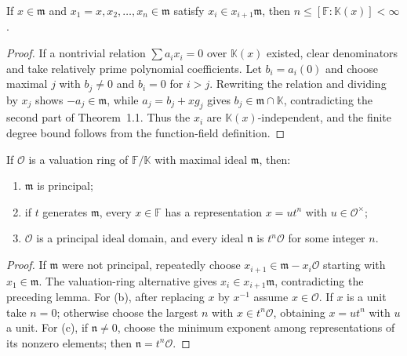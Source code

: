 \begin{lemma}
\label{par-lem-maximal-chain}
\uses{}
If $x\in\mathfrak m$ and $x_1=x,x_2,\ldots,x_n\in\mathfrak m$ satisfy
$x_i\in x_{i+1}\mathfrak m$, then
$n\leq[\mathbb F:\mathbb K(x)]<\infty$.
\end{lemma}
\begin{proof}
If a nontrivial relation $\sum a_ix_i=0$ over $\mathbb K(x)$ existed, clear
denominators and take relatively prime polynomial coefficients. Let $b_i=a_i(0)$
and choose maximal $j$ with $b_j\neq0$ and $b_i=0$ for $i>j$. Rewriting the
relation and dividing by $x_j$ shows $-a_j\in\mathfrak m$, while
$a_j=b_j+xg_j$ gives $b_j\in\mathfrak m\cap\mathbb K$, contradicting the
second part of Theorem~1.1. Thus the $x_i$ are $\mathbb K(x)$-independent, and
the finite degree bound follows from the function-field definition.
\end{proof}

\begin{theorem}
\label{par-thm-valuation-ring-structure}
\uses{}
If $\mathcal O$ is a valuation ring of $\mathbb F/\mathbb K$ with maximal
ideal $\mathfrak m$, then:
\begin{enumerate}
\item $\mathfrak m$ is principal;
\item if $t$ generates $\mathfrak m$, every $x\in\mathbb F$ has a representation
$x=ut^n$ with $u\in\mathcal O^\times$;
\item $\mathcal O$ is a principal ideal domain, and every ideal $\mathfrak n$ is
$t^n\mathcal O$ for some integer $n$.
\end{enumerate}
\end{theorem}
\begin{proof}
If $\mathfrak m$ were not principal, repeatedly choose
$x_{i+1}\in\mathfrak m-x_i\mathcal O$ starting with $x_1\in\mathfrak m$.
The valuation-ring alternative gives $x_i\in x_{i+1}\mathfrak m$, contradicting
the preceding lemma. For (b), after replacing $x$ by $x^{-1}$ assume $x\in\mathcal O$.
If $x$ is a unit take $n=0$; otherwise choose the largest $n$ with
$x\in t^n\mathcal O$, obtaining $x=ut^n$ with $u$ a unit. For (c), if
$\mathfrak n\neq0$, choose the minimum exponent among representations of its
nonzero elements; then $\mathfrak n=t^n\mathcal O$.
\end{proof}

